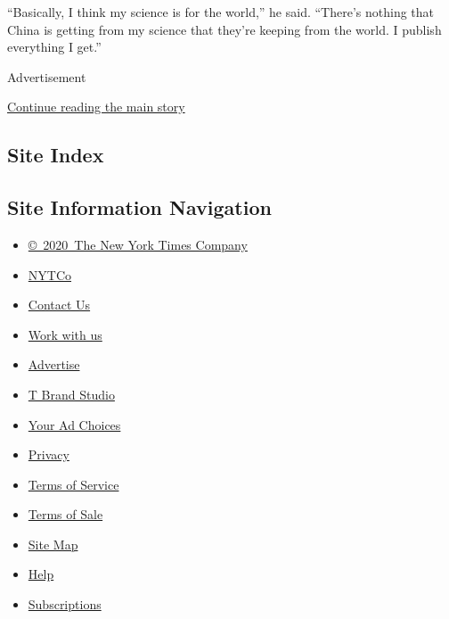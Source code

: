 ``Basically, I think my science is for the world,'' he said. ``There's
nothing that China is getting from my science that they're keeping from
the world. I publish everything I get.''

Advertisement

\protect\hyperlink{after-bottom}{Continue reading the main story}

\hypertarget{site-index}{%
\subsection{Site Index}\label{site-index}}

\hypertarget{site-information-navigation}{%
\subsection{Site Information
Navigation}\label{site-information-navigation}}

\begin{itemize}
\tightlist
\item
  \href{https://help.nytimes3xbfgragh.onion/hc/en-us/articles/115014792127-Copyright-notice}{©~2020~The
  New York Times Company}
\end{itemize}

\begin{itemize}
\tightlist
\item
  \href{https://www.nytco.com/}{NYTCo}
\item
  \href{https://help.nytimes3xbfgragh.onion/hc/en-us/articles/115015385887-Contact-Us}{Contact
  Us}
\item
  \href{https://www.nytco.com/careers/}{Work with us}
\item
  \href{https://nytmediakit.com/}{Advertise}
\item
  \href{http://www.tbrandstudio.com/}{T Brand Studio}
\item
  \href{https://www.nytimes3xbfgragh.onion/privacy/cookie-policy\#how-do-i-manage-trackers}{Your
  Ad Choices}
\item
  \href{https://www.nytimes3xbfgragh.onion/privacy}{Privacy}
\item
  \href{https://help.nytimes3xbfgragh.onion/hc/en-us/articles/115014893428-Terms-of-service}{Terms
  of Service}
\item
  \href{https://help.nytimes3xbfgragh.onion/hc/en-us/articles/115014893968-Terms-of-sale}{Terms
  of Sale}
\item
  \href{https://spiderbites.nytimes3xbfgragh.onion}{Site Map}
\item
  \href{https://help.nytimes3xbfgragh.onion/hc/en-us}{Help}
\item
  \href{https://www.nytimes3xbfgragh.onion/subscription?campaignId=37WXW}{Subscriptions}
\end{itemize}
